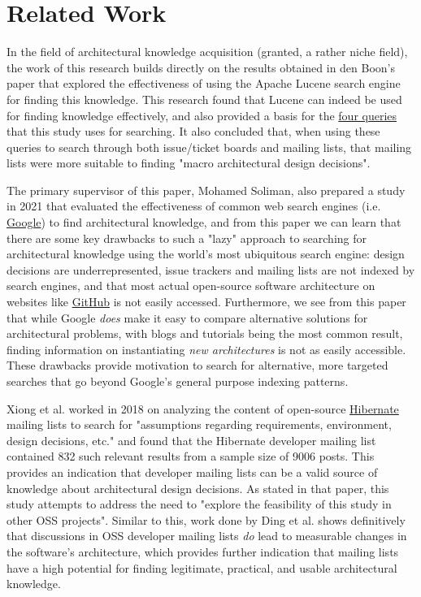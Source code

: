\documentclass[a4paper, 12pt]{article}
\begin{document}
\section{Related Work}
	In the field of architectural knowledge acquisition (granted, a rather niche field), the work of this research builds directly on the results obtained in den Boon's paper that explored the effectiveness of using the Apache Lucene search engine for finding this knowledge\cite{denboon}. This research found that Lucene can indeed be used for finding knowledge effectively, and also provided a basis for the \hyperref[sec:queries]{four queries} that this study uses for searching. It also concluded that, when using these queries to search through both issue/ticket boards and mailing lists, that mailing lists were more suitable to finding "macro architectural design decisions".
	
	The primary supervisor of this paper, Mohamed Soliman, also prepared a study in 2021 that evaluated the effectiveness of common web search engines (i.e. \href{https://google.com}{Google}) to find architectural knowledge, and from this paper we can learn that there are some key drawbacks to such a "lazy" approach to searching for architectural knowledge using the world's most ubiquitous search engine: design decisions are underrepresented, issue trackers and mailing lists are not indexed by search engines, and that most actual open-source software architecture on websites like \href{https://github.com}{GitHub} is not easily accessed. Furthermore, we see from this paper that while Google \textit{does} make it easy to compare alternative solutions for architectural problems, with blogs and tutorials being the most common result, finding information on instantiating \textit{new architectures} is not as easily accessible. These drawbacks provide motivation to search for alternative, more targeted searches that go beyond Google's general purpose indexing patterns\cite{soliman}.
	
	Xiong et al. worked in 2018 on analyzing the content of open-source \href{https://hibernate.org/}{Hibernate} mailing lists to search for "assumptions regarding requirements, environment, design decisions, etc." and found that the Hibernate developer mailing list contained 832 such relevant results from a sample size of 9006 posts. This provides an indication that developer mailing lists can be a valid source of knowledge about architectural design decisions\cite{xiong}. As stated in that paper, this study attempts to address the need to "explore the feasibility of this study in other OSS projects". Similar to this, work done by Ding et al. shows definitively that discussions in OSS developer mailing lists \textit{do} lead to measurable changes in the software's architecture, which provides further indication that mailing lists have a high potential for finding legitimate, practical, and usable architectural knowledge\cite{ding}.
	
\end{document}
